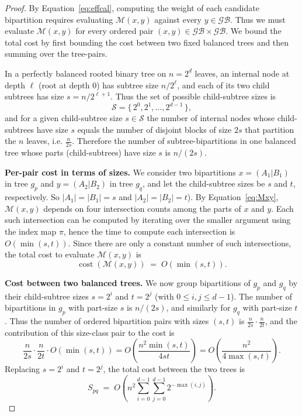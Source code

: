\documentclass[10pt,a4paper]{article}
\begin{document}
\begin{proof}
By Equation~\eqref{eq:effcal}, computing the weight of each candidate
bipartition requires evaluating \(\mathcal{M}(x,y)\) against every
\(y\in\mathcal{GB}\). Thus we must evaluate \(\mathcal{M}(x,y)\) for
every ordered pair \((x,y)\in\mathcal{GB}\times\mathcal{GB}\). We bound
the total cost by first bounding the cost between two fixed balanced
trees and then summing over the tree-pairs.

In a perfectly balanced rooted binary tree on \(n=2^{d}\) leaves,
an internal node at depth \(\ell\) (root at depth \(0\)) has subtree
size \(n/2^{\ell}\), and each of its two child subtrees has size
\(s = n/2^{\ell+1}\). Thus the set of possible child-subtree sizes is
\[
\mathcal{S}=\{\,2^{0},2^{1},\dots,2^{d-1}\,\},
\]
and for a given child-subtree size \(s\in\mathcal{S}\) the number of
internal nodes whose child-subtrees have size \(s\) equals the number of
disjoint blocks of size \(2s\) that partition the \(n\) leaves, i.e.
\(\frac{n}{2s}\). Therefore the number of subtree-bipartitions in one balanced tree whose parts (child-subtrees) have size \(s\)
is \(n/(2s)\).

\textbf{Per-pair cost in terms of sizes.}
We consider two bipartitions \(x=(A_{1}|B_{1})\) in tree \(g_p\) and
\(y=(A_{2}|B_{2})\) in tree \(g_q\), and let the child-subtree sizes
be \(s\) and \(t\), respectively. So \(|A_{1}|=|B_{1}|=s\) and
\(|A_{2}|=|B_{2}|=t\)). By Equation~\eqref{eq:Mxy}, \(\mathcal{M}(x,y)\)
depends on four intersection counts among the parts of \(x\) and
\(y\). Each such intersection can be computed by iterating over the
smaller argument using the index map \(\pi\), hence the time to compute each intersection is \(O(\min(s,t))\). Since there are only a constant number of
such intersections, the total cost to evaluate \(\mathcal{M}(x,y)\) is
\[
\operatorname{cost}(\mathcal{M}(x,y)) \;=\; O(\min(s,t)).
\]

\textbf{Cost between two balanced trees.}
We now group bipartitions of \(g_p\) and \(g_q\) by their child-subtree sizes
\(s=2^{i}\) and \(t=2^{j}\) (with \(0\le i,j\le d-1\)). The number of
bipartitions in \(g_p\) with part-size \(s\) is \(n/(2s)\), and similarly
for \(g_q\) with part-size \(t\). Thus the number of ordered bipartition
pairs with sizes \((s,t)\) is \(\frac{n}{2s}\cdot\frac{n}{2t}\), and the
contribution of this size-class pair to the cost is
\[
\frac{n}{2s}\cdot\frac{n}{2t}\cdot O(\min(s,t))
= O\!\left(\frac{n^{2}\min(s,t)}{4st}\right)
= O\!\left(\frac{n^{2}}{4\max(s,t)}\right).
\]
Replacing \(s=2^{i}\) and \(t=2^{j}\), the total cost between the two
trees is
\[
S_{pq} \;=\; O\!\left(n^{2}\sum_{i=0}^{d-1}\sum_{j=0}^{d-1} 2^{-\max(i,j)}\right).
\]



\end{proof}
\end{document}
